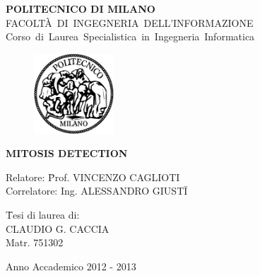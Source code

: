 
\thispagestyle{empty} \cleardoublepage
\begin{center}
 \LARGE{\textbf{POLITECNICO DI MILANO}}\\
 \mbox{\large{FACOLT\`{A} DI INGEGNERIA DELL'INFORMAZIONE}}\\
 \mbox{\Large{Corso di Laurea Specialistica in Ingegneria Informatica} }
\end{center}

\addvspace{1cm}

\begin{figure}[h]
 \centering
 \includegraphics[width=3cm]{./images/poli}
\end{figure}

\addvspace{1cm}

\begin{center}
 \begin{large}
  \textbf{MITOSIS DETECTION}
 \end{large}
\end{center}

\addvspace{3cm}
\begin{Large}
 \begin{flushleft}
  \begin{tabbing}
   Relatore: \hspace{8pt}  \= Prof. VINCENZO CAGLIOTI\\
   Correlatore: \> Ing. ALESSANDRO GIUSTI\= \+ \\
  \end{tabbing}
 \end{flushleft}


 \addvspace{3cm}
 \begin{flushright}
 \begin{tabbing}
  \hspace{300pt}
  \= Tesi di laurea di:\\
  \> CLAUDIO G. CACCIA \\
  \> Matr. 751302\\
 \end{tabbing}
 \end{flushright}

 \addvspace{2.5cm}
 \begin{center}
  Anno Accademico 2012 - 2013
 \end{center}

\end{Large}
\newpage

